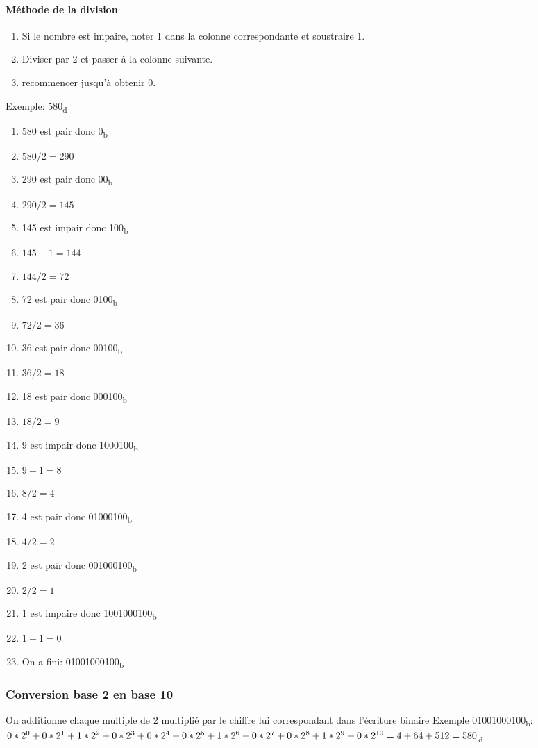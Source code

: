  \paragraph{Méthode de la division}
 \begin{enumerate}
	 \item Si le nombre est impaire, noter 1 dans la colonne correspondante et soustraire 1.
	 \item Diviser par 2 et passer à la colonne suivante.
	 \item recommencer jusqu'à obtenir 0.
 \end{enumerate}
 Exemple: 580\textsubscript{d}
 \begin{enumerate}
	 \item 580 est pair donc 0\textsubscript{b}
	 \item $580/2 = 290$
	 \item 290 est pair donc 00\textsubscript{b}
	 \item $290/2 = 145$
	 \item 145 est impair donc 100\textsubscript{b}
	 \item $145-1 = 144$
	 \item $144/2 = 72$
	 \item 72 est pair donc  0100\textsubscript{b}
	 \item $72/2 = 36$
	 \item 36 est pair donc 00100\textsubscript{b}
	 \item $36/2 = 18$
	 \item 18 est pair donc 000100\textsubscript{b}
	 \item $18/2 = 9$
	 \item 9 est impair donc 1000100\textsubscript{b}
	 \item $9-1 = 8$
	 \item $8/2 = 4$
	 \item 4 est pair donc 01000100\textsubscript{b}
	 \item $4/2 = 2$
	 \item 2 est pair donc 001000100\textsubscript{b}
	 \item $2/2 = 1$
	 \item 1 est impaire donc 1001000100\textsubscript{b}
	 \item $1-1 = 0$
	 \item On a fini: 01001000100\textsubscript{b}
 \end{enumerate}

 \subsubsection{Conversion base 2 en base 10}
 On additionne chaque multiple de 2 multiplié par le chiffre lui correspondant dans l'écriture binaire
 Exemple 01001000100\textsubscript{b}:\\
 $0*2^0 + 0*2^1 + 1*2^2 + 0*2^3 +0*2^4 +0*2^5 + 1*2^6 + 0*2^7 +0*2^8 + 1*2^9 + 0*2^{10} \\= 4 + 64 + 512 = 580$\textsubscript{d}


